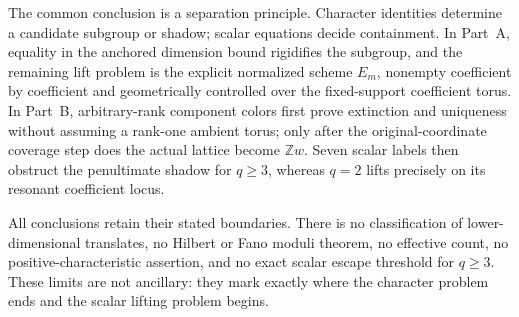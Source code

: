 \documentclass[11pt]{article}
\newcommand{\Z}{\mathbb{Z}}
\theoremstyle{remark}
\numberwithin{equation}{section}
\begin{document}
The common conclusion is a separation principle.  Character identities determine a candidate subgroup or shadow; scalar equations decide containment.  In Part~A, equality in the anchored dimension bound rigidifies the subgroup, and the remaining lift problem is the explicit normalized scheme \(E_m\), nonempty coefficient by coefficient and geometrically controlled over the fixed-support coefficient torus.  In Part~B, arbitrary-rank component colors first prove extinction and uniqueness without assuming a rank-one ambient torus; only after the original-coordinate coverage step does the actual lattice become \(\Z w\).  Seven scalar labels then obstruct the penultimate shadow for \(q\geq3\), whereas \(q=2\) lifts precisely on its resonant coefficient locus.

All conclusions retain their stated boundaries.  There is no classification of lower-dimensional translates, no Hilbert or Fano moduli theorem, no effective count, no positive-characteristic assertion, and no exact scalar escape threshold for \(q\geq3\).  These limits are not ancillary: they mark exactly where the character problem ends and the scalar lifting problem begins.

\clearpage


\end{document}
